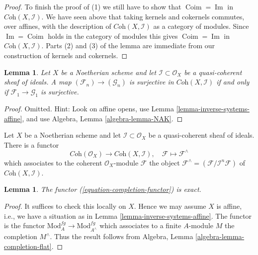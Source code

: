 \documentclass{stacks-project}
\theoremstyle{plain}
\newtheorem{lemma}[subsection]{Lemma}
\theoremstyle{definition}
\theoremstyle{remark}
\numberwithin{equation}{subsection}
\def\Im{\mathop{\mathrm{Im}}}
\def\Coim{\mathop{\mathrm{Coim}}}
\begin{document}
\begin{proof}
\medskip\noindent
To finish the proof of (1) we still have to show that $\Coim = \Im$
in $\textit{Coh}(X, \mathcal{I})$. We have seen above that taking
kernels and cokernels commutes, over affines, with the description
of $\textit{Coh}(X, \mathcal{I})$ as a category of modules. Since
$\Im = \Coim$ holds in the category of modules
this gives $\Coim = \Im$ in $\textit{Coh}(X, \mathcal{I})$.
Parts (2) and (3) of the lemma are immediate from our construction
of kernels and cokernels.
\end{proof}

\begin{lemma}
\label{lemma-inverse-systems-surjective}
Let $X$ be a Noetherian scheme and let $\mathcal{I} \subset \mathcal{O}_X$
be a quasi-coherent sheaf of ideals. A map
$(\mathcal{F}_n) \to (\mathcal{G}_n)$ is surjective in
$\textit{Coh}(X, \mathcal{I})$
if and only if $\mathcal{F}_1 \to \mathcal{G}_1$ is surjective.
\end{lemma}

\begin{proof}
Omitted. Hint: Look on affine opens, use
Lemma \ref{lemma-inverse-systems-affine}, and use
Algebra, Lemma \ref{algebra-lemma-NAK}.
\end{proof}

\noindent
Let $X$ be a Noetherian scheme and let $\mathcal{I} \subset \mathcal{O}_X$
be a quasi-coherent sheaf of ideals. There is a functor
\begin{equation}
\label{equation-completion-functor}
\textit{Coh}(\mathcal{O}_X) \longrightarrow \textit{Coh}(X, \mathcal{I}), \quad
\mathcal{F} \longmapsto \mathcal{F}^\wedge
\end{equation}
which associates to the coherent $\mathcal{O}_X$-module $\mathcal{F}$
the object $\mathcal{F}^\wedge = (\mathcal{F}/\mathcal{I}^n\mathcal{F})$
of $\textit{Coh}(X, \mathcal{I})$.

\begin{lemma}
\label{lemma-exact}
The functor (\ref{equation-completion-functor}) is exact.
\end{lemma}

\begin{proof}
It suffices to check this locally on $X$. Hence we may assume $X$ is
affine, i.e., we have a situation as in
Lemma \ref{lemma-inverse-systems-affine}.
The functor is the functor $\text{Mod}^{fg}_A \to \text{Mod}^{fg}_{A^\wedge}$
which associates to a finite $A$-module $M$ the completion $M^\wedge$.
Thus the result follows from
Algebra, Lemma \ref{algebra-lemma-completion-flat}.
\end{proof}
\end{document}
